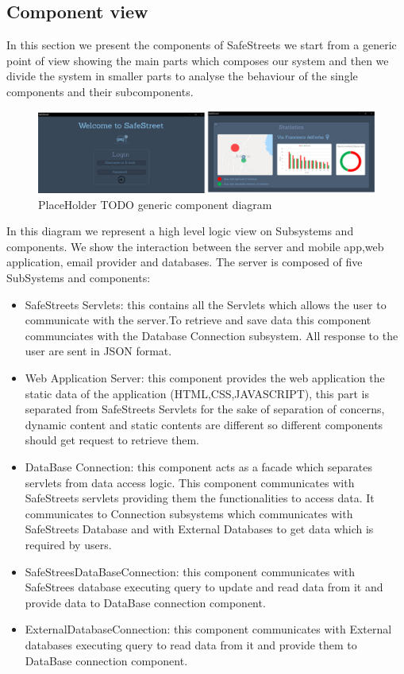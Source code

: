 \subsection{Component view}
In this section we present the components of SafeStreets we start from a generic point of view showing the main parts which composes our system and then we divide the system in smaller parts to analyse the behaviour of the single components and their subcomponents.
\newline
\begin{figure}[h]
\centering
\includegraphics[width=\textwidth]{Images/desktop_common_interface.png}
\caption{\label{fig:ComWI}PlaceHolder TODO generic component diagram}
\end{figure}
In this diagram we represent a high level logic view on Subsystems and components. We show the interaction between the server and mobile app,web application, email provider and databases.
The server is composed of five SubSystems and components:
\begin{itemize}
\item SafeStreets Servlets: this contains all the Servlets which allows the user to communicate with the server.To retrieve and save data this component communciates with the Database Connection subsystem. All response to the user are sent in JSON format. 
\item Web Application Server: this component provides the web application the static data of the application (HTML,CSS,JAVASCRIPT), this part is separated from SafeStreets Servlets for the sake of separation of concerns, dynamic content and static contents are different so different components should get request to retrieve them.
\item DataBase Connection: this component acts as a facade which separates servlets from data access logic. This component communicates with SafeStreets servlets providing them the functionalities to access data.
It communicates to Connection subsystems which communicates with SafeStreets Database and with External Databases to get data which is required by users.
\item SafeStreesDataBaseConnection: this component communicates with SafeStrees database executing query to update and read data from it and provide data to DataBase connection component. 
\item ExternalDatabaseConnection: this component communicates with External databases executing query to read data from it and provide them to DataBase connection component.
\end{itemize}
